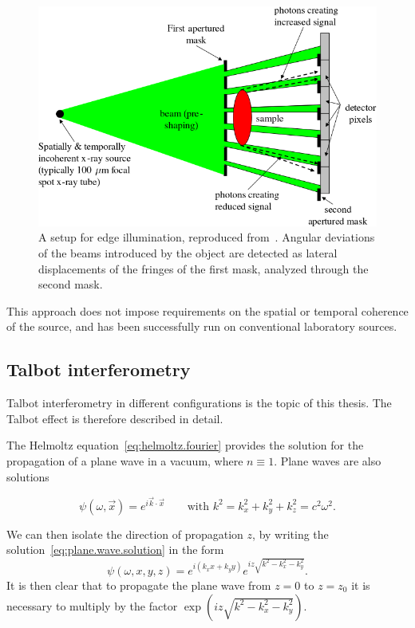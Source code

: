 \begin{figure}[htb]
    \centering
    \includegraphics[width=.6\textwidth]{gfx/edgeillumination.png}
    \caption[Edge illumination.]{A setup for edge illumination, reproduced
        from~\cite{edge-illumination-picture}. Angular
        deviations of the beams introduced by the object are detected as
        lateral displacements of the fringes of the first mask, analyzed
        through the second mask.}
    \label{fig:edge-illumination}
\end{figure}



This approach does not impose requirements on the spatial or temporal
coherence of the source, and has been successfully run on conventional
laboratory sources.

\subsection{Talbot interferometry}\label{sec:talbot-interferometry}
Talbot interferometry in different configurations is the topic of this
thesis. The Talbot effect is therefore described in detail.

The Helmoltz equation~\eqref{eq:helmoltz.fourier} provides the solution for
the propagation of a plane wave in a vacuum, where $n \equiv 1$. Plane waves
are also solutions

\begin{equation}
    \psi(\omega, \vec{x}) = e^{i\vec{k}\cdot \vec{x}} \qquad \text{with } k^2
    = k_x^2 + k_y^2 + k_z^2 = c^2 \omega^2.
    \label{eq:plane.wave.solution}
\end{equation}

We can then isolate the direction
of propagation $z$, by writing the solution~\eqref{eq:plane.wave.solution} in the form
\begin{equation}
    \psi(\omega, x, y, z) = e^{i(k_x x + k_y y)}e^{iz\sqrt{k^2 - k_x^2 -
    k_y^2}}.
    \label{eq:free.propagation}
\end{equation}
It is then clear that to propagate the plane wave from $z = 0$ to $z = z_0$
it is necessary to multiply by the factor $\exp(iz\sqrt{k^2 - k_x^2 -
k_y^2})$.

